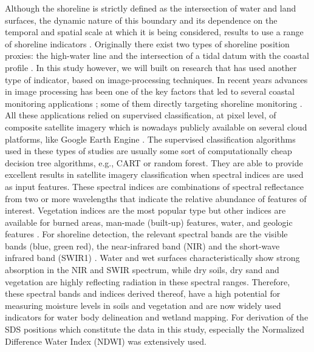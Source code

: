 \documentclass[format=sigconf, review=false, screen=true]{acmart}
\begin{document}
Although the shoreline is strictly defined as the intersection of water and land surfaces, the dynamic nature of this boundary and its dependence on the temporal and spatial scale at which it is being considered, results to use a range of shoreline indicators \citep{Boak2005shoreline}. Originally there exist two types of shoreline position proxies: the high-water line and the intersection of a tidal datum with the coastal profile \citep{Boak2005shoreline}. In this study however, we will built on research that has used another type of indicator, based on image-processing techniques. In recent years advances in image processing has been one of the key factors that led to several coastal monitoring applications \citep{Murray2018global}; some of them directly targeting shoreline monitoring \citep{Luijendijk2018state, harley2019shoreline, Calkoen2019beaches, Vos2019sub}. All these applications relied on supervised classification, at pixel level, of composite satellite imagery which is nowadays publicly available on several cloud platforms, like Google Earth Engine \citep{Gorelick2017google}. The supervised classification algorithms used in these types of studies are usually some sort of computationally cheap decision tree algorithms, e.g., CART or random forest. They are able to provide excellent results in satellite imagery classification when spectral indices are used as input features. These spectral indices are combinations of spectral reflectance from two or more wavelengths that indicate the relative abundance of features of interest. Vegetation indices are the most popular type but other indices are available for burned areas, man-made (built-up) features, water, and geologic features \citep{Calkoen2019beaches}. For shoreline detection, the relevant spectral bands are the visible bands (blue, green red), the near-infrared band (NIR) and the short-wave infrared band (SWIR1) \citep{Vos2019sub}. Water and wet surfaces characteristically show strong absorption in the NIR and SWIR spectrum, while dry soils, dry sand and vegetation are highly reflecting radiation in these spectral ranges. Therefore, these spectral bands and indices derived thereof, have a high potential for measuring moisture levels in soils and vegetation and are now widely used indicators for water body delineation and wetland mapping. For derivation of the SDS positions which constitute the data in this study, especially the Normalized Difference Water Index (NDWI) was extensively used. 
\end{document}
